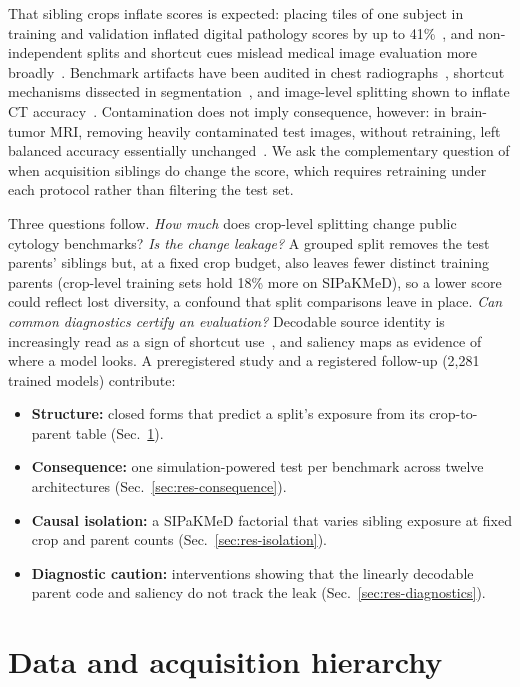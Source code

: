 \documentclass{article}
\begin{document}
That sibling crops inflate scores is expected: placing tiles of one subject in training and validation inflated digital pathology scores by up to 41\%~\cite{bussola2021tiles}, and non-independent splits and shortcut cues mislead medical image evaluation more broadly~\cite{kapoor2023leakage,geirhos2020shortcut,varoquaux2022failures}. Benchmark artifacts have been audited in chest radiographs~\cite{jimenez2023shortcuts}, shortcut mechanisms dissected in segmentation~\cite{lin2024shortcut}, and image-level splitting shown to inflate CT accuracy~\cite{obeten2026kidney}. Contamination does not imply consequence, however: in brain-tumor MRI, removing heavily contaminated test images, without retraining, left balanced accuracy essentially unchanged~\cite{vangala2026scores}. We ask the complementary question of when acquisition siblings do change the score, which requires retraining under each protocol rather than filtering the test set.

Three questions follow. \emph{How much} does crop-level splitting change public cytology benchmarks? \emph{Is the change leakage?} A grouped split removes the test parents' siblings but, at a fixed crop budget, also leaves fewer distinct training parents (crop-level training sets hold 18\% more on SIPaKMeD), so a lower score could reflect lost diversity, a confound that split comparisons leave in place. \emph{Can common diagnostics certify an evaluation?} Decodable source identity is increasingly read as a sign of shortcut use~\cite{germani2026aggregation}, and saliency maps as evidence of where a model looks. A preregistered study and a registered follow-up (2,281 trained models) contribute:
\begin{itemize}
\item \textbf{Structure:} closed forms that predict a split's exposure from its crop-to-parent table (Sec.~\ref{sec:data}).
\item \textbf{Consequence:} one simulation-powered test per benchmark across twelve architectures (Sec.~\ref{sec:res-consequence}).
\item \textbf{Causal isolation:} a SIPaKMeD factorial that varies sibling exposure at fixed crop and parent counts (Sec.~\ref{sec:res-isolation}).
\item \textbf{Diagnostic caution:} interventions showing that the linearly decodable parent code and saliency do not track the leak (Sec.~\ref{sec:res-diagnostics}).
\end{itemize}

\section{Data and acquisition hierarchy}
\label{sec:data}
\end{document}
